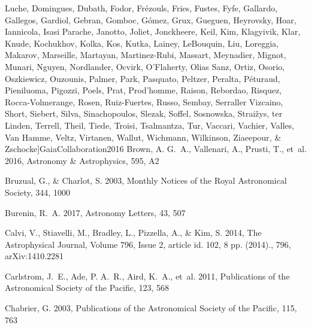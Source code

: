 \documentclass[apj, revtex4-1]{emulateapj}
\begin{document}
\begin{thebibliography}{}
{{  Luche}, Domingues, Dubath, Fodor, Fr{\'{e}}zouls, Fries, Fustes, Fyfe,
  Gallardo, Gallegos, Gardiol, Gebran, Gomboc, G{\'{o}}mez, Grux, Gueguen,
  Heyrovsky, Hoar, Iannicola, {Isasi Parache}, Janotto, Joliet, Jonckheere,
  Keil, Kim, Klagyivik, Klar, Knude, Kochukhov, Kolka, Kos, Kutka, Lainey,
  LeBouquin, Liu, Loreggia, Makarov, Marseille, Martayan, Martinez-Rubi,
  Massart, Meynadier, Mignot, Munari, Nguyen, Nordlander, Ocvirk, O'Flaherty,
  {Olias Sanz}, Ortiz, Osorio, Oszkiewicz, Ouzounis, Palmer, Park, Pasquato,
  Peltzer, Peralta, P{\'{e}}turaud, Pieniluoma, Pigozzi, Poels, Prat,
  Prod'homme, Raison, Rebordao, Risquez, Rocca-Volmerange, Rosen, Ruiz-Fuertes,
  Russo, Sembay, {Serraller Vizcaino}, Short, Siebert, Silva, Sinachopoulos,
  Slezak, Soffel, Sosnowska, Strai{\v{z}}ys, ter Linden, Terrell, Theil, Tiede,
  Troisi, Tsalmantza, Tur, Vaccari, Vachier, Valles, {Van Hamme}, Veltz,
  Virtanen, Wallut, Wichmann, Wilkinson, Ziaeepour, \&
  Zschocke}]{GaiaCollaboration2016}
Brown, A. G.~A., Vallenari, A., Prusti, T., {et~al.} 2016, Astronomy {\&}
  Astrophysics, 595, A2

Bruzual, G., \& Charlot, S. 2003, Monthly Notices of the Royal Astronomical
  Society, 344, 1000

Burenin, R.~A. 2017, Astronomy Letters, 43, 507

Calvi, V., Stiavelli, M., Bradley, L., Pizzella, A., \& Kim, S. 2014, The
  Astrophysical Journal, Volume 796, Issue 2, article id. 102, 8 pp. (2014).,
  796, arXiv:1410.2281

Carlstrom, J.~E., Ade, P. A.~R., Aird, K.~A., {et~al.} 2011, Publications of
  the Astronomical Society of the Pacific, 123, 568

Chabrier, G. 2003, Publications of the Astronomical Society of the Pacific,
  115, 763


\end{thebibliography}
\end{document}
